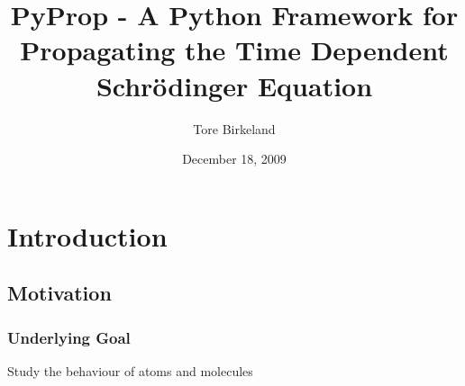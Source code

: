 \documentclass{beamer}
\title{PyProp - A Python Framework for Propagating the Time Dependent Schrödinger Equation}
\author{Tore Birkeland}
\institute{
Department of Mathematics, University of Bergen
}
\date{December 18, 2009}
\begin{document}

\begin{frame}
  \titlepage
  \vspace{5cm}
\end{frame}

%
%


\section{Introduction}

%	



\subsection{Motivation}

\begin{frame}
	\frametitle{Underlying Goal}
	
	\begin{center}
		\Large
		Study the behaviour of atoms and molecules
	\end{center}

\end{frame}
\end{document}
